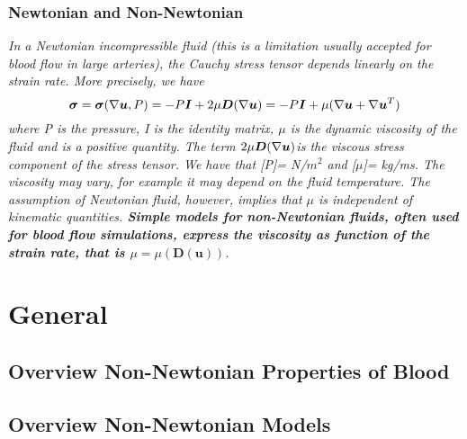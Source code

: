 \documentclass[11pt,letterpaper]{article}
\begin{document}
\subsubsection*{Newtonian and Non-Newtonian}
\textit{ In a Newtonian incompressible fluid (this is a limitation usually accepted for blood flow in large arteries), the Cauchy stress tensor depends
linearly on the strain rate. More precisely, we have \begin{equation}
    \bm{\sigma} = \bm{\sigma}(\nabla\bm{u},P)= -P\bm{I} +2\mu\bm{D}(\nabla\bm{u})= -P\bm{I} + \mu(\nabla\bm{u}+\nabla\bm{u}^T)
\end{equation}
where P is the pressure, I is the identity matrix, $\mu$ is the dynamic viscosity of the fluid and is a positive quantity. The term $2\mu\bm{D}(\nabla\bm{u})$is the viscous stress component of the stress tensor. We
have that [P]= N/$m^2$ and [$\mu$]= kg/ms. The viscosity may vary, for example it may depend on the fluid temperature. The assumption of Newtonian fluid, however, implies that $\mu$ is independent of kinematic quantities. \textbf{Simple models for non-Newtonian fluids, often used for blood flow simulations, express the viscosity as function of the strain rate, that is $\mu = \mu(\bm{D}(\bm{u}))$}. }











\newpage
\section{General}

\subsection*{Overview Non-Newtonian Properties of Blood
}


\newpage
\subsection*{Overview Non-Newtonian Models
}


\newpage
\end{document}
